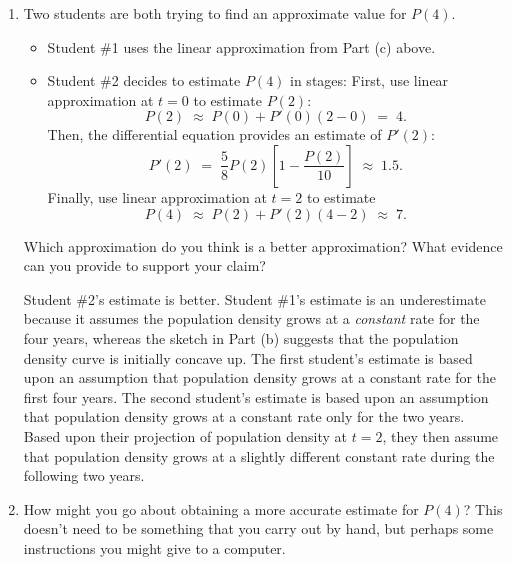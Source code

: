 \documentclass[main]{subfiles}
\begin{document}
\begin{enumerate}
\begin{enumerate}[resume]
  \item
  \begin{problem}[1.0in]
    Two students are both trying to find an approximate value for $P(4)$.
    \begin{itemize}
      \item Student {\#1} uses the linear approximation from Part (c) above.
      \item Student {\#2} decides to estimate $P(4)$ in stages:  First, use
      linear approximation at $t = 0$ to estimate $P(2)$:
      $$
        P(2) \; \approx \; P(0) + P'(0)(2 - 0) \; = \; 4.
      $$
      Then, the differential equation provides an estimate of $P'(2)$:
      $$
        P'(2) \; = \; \frac{5}{8} P(2) \left[ 1 - \frac{P(2)}{10} \right] \; \approx \; 1.5.
      $$
      Finally, use linear approximation at $t=2$ to estimate
      $$
        P(4) \; \approx \; P(2) + P'(2)(4 - 2) \; \approx \; 7.
      $$
    \end{itemize}
    Which approximation do you think is a better approximation?  What evidence can you provide to support your claim?
  \end{problem}
    
  \begin{solution} 
    Student {\#2}'s estimate is better.  
    Student {\#1}'s estimate is an underestimate because it assumes 
    the population density grows at a {\em constant} rate for the four years, whereas the sketch in Part (b) 
    suggests that the population density curve is initially concave up.
    The first student's estimate is based upon an assumption that population density
    grows at a constant rate for the first four years.  The second student's estimate is
    based upon an assumption that population density grows at a constant rate only for the
    two years.  Based upon their projection of population density at $t = 2$, they then
    assume that population density grows at a slightly different constant rate during the
    following two years.
  \end{solution}
    
  \item
  \begin{problem}[1in]
    How might you go about obtaining a more accurate estimate for $P(4)$?
    This doesn't need to be something that you carry out by hand, but perhaps 
    some instructions you might give to a computer.
  \end{problem} 
      

\end{enumerate}
\end{enumerate}
\end{document}
